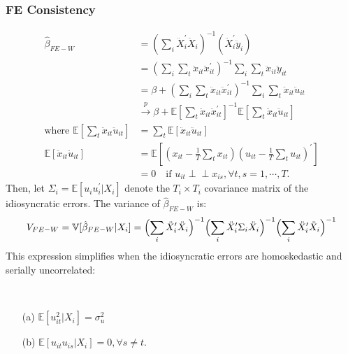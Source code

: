 \subsubsection{FE Consistency}
\begin{align*}
    \hat{\beta}_{FE-W} &= \left( \sum_{i} \ddot{X}_i^{\prime} \ddot{X}_i \right)^{-1} \left( \ddot{X}_i^{\prime} \ddot{y}_i \right) \\
    &= \left(\sum_i \sum_t \ddot{x}_{it} \ddot{x}_{it}^{\prime} \right)^{-1} \sum_i \sum_t \ddot{x}_{it} \ddot{y}_{it} \\
    &= \beta + \left(\sum_i \sum_t \ddot{x}_{it} \ddot{x}_{it}^{\prime} \right)^{-1} \sum_i \sum_t \ddot{x}_{it} \ddot{u}_{it} \\
    &\overset{p}{\rightarrow} \beta + \mathbb{E}\left[\sum_t \ddot{x}_{it} \ddot{x}_{it}^{\prime} \right]^{-1} \mathbb{E}\left[\sum_t \ddot{x}_{it} \ddot{u}_{it} \right] \\
    \text{where } \mathbb{E}\left[\sum_t \ddot{x}_{it} \ddot{u}_{it}\right] &= \sum_t \mathbb{E}\left[\ddot{x}_{it} \ddot{u}_{it} \right]\\
    \mathbb{E}\left[\ddot{x}_{it} \ddot{u}_{it} \right] &= \mathbb{E}\left[\left(x_{it} - \frac{1}{T}\sum_t x_{it} \right) \left(u_{it} - \frac{1}{T}\sum_t u_{it} \right)^{\prime} \right] \\
    &= 0 \quad \text{if } u_{it} \perp\!\!\!\perp x_{is}, \forall t, s = 1, \cdots, T.
\end{align*}
Then, let $\Sigma_i = \mathbb{E}[u_i u_i^{\prime} | X_i]$ denote the $T_i \times T_i$ covariance matrix of the idiosyncratic errors.
The variance of $\hat{\beta}_{FE-W}$ is:
\begin{gather*}
    V_{FE-W} = \mathbb{V}[\hat{\beta}_{FE-W} | X_i] = \Bigl( \sum_{i} \ddot{X}_i^{\prime} \ddot{X}_i \Bigr)^{-1} \Bigl( \sum_{i} \ddot{X}_i^{\prime} \Sigma_i \ddot{X}_i \Bigr)^{-1} \Bigl( \sum_{i} \ddot{X}_i^{\prime} \ddot{X}_i \Bigr)^{-1} 
\end{gather*}
This expression simplifies when the idiosyncratic errors are homoskedastic and serially uncorrelated:
\begin{assumption}[FE homoskedasticity]\label{FE-homoskedasticity}
    \

    \begin{enumerate}
        \item[(a)] $\mathbb{E}[u_{it}^2 | X_i] = \sigma_u^2$ 
        \item[(b)] $\mathbb{E}[u_{it} u_{is} | X_i] = 0, \forall s \neq t.$
    \end{enumerate}
\end{assumption}

